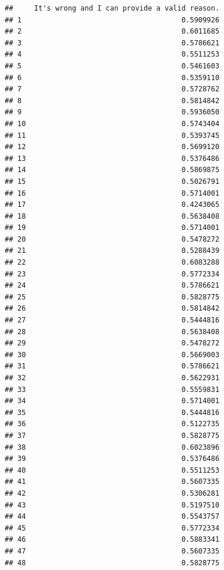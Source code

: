 \documentclass[
  american,
  man,floatsintext]{apa7}
\begin{document}
\begin{verbatim}
##     It's wrong and I can provide a valid reason.
## 1                                      0.5909926
## 2                                      0.6011685
## 3                                      0.5786621
## 4                                      0.5511253
## 5                                      0.5461603
## 6                                      0.5359110
## 7                                      0.5728762
## 8                                      0.5814842
## 9                                      0.5936050
## 10                                     0.5743404
## 11                                     0.5393745
## 12                                     0.5699120
## 13                                     0.5376486
## 14                                     0.5869875
## 15                                     0.5026791
## 16                                     0.5714001
## 17                                     0.4243065
## 18                                     0.5638408
## 19                                     0.5714001
## 20                                     0.5478272
## 21                                     0.5288439
## 22                                     0.6083288
## 23                                     0.5772334
## 24                                     0.5786621
## 25                                     0.5828775
## 26                                     0.5814842
## 27                                     0.5444816
## 28                                     0.5638408
## 29                                     0.5478272
## 30                                     0.5669003
## 31                                     0.5786621
## 32                                     0.5622931
## 33                                     0.5559831
## 34                                     0.5714001
## 35                                     0.5444816
## 36                                     0.5122735
## 37                                     0.5828775
## 38                                     0.6023896
## 39                                     0.5376486
## 40                                     0.5511253
## 41                                     0.5607335
## 42                                     0.5306281
## 43                                     0.5197510
## 44                                     0.5543757
## 45                                     0.5772334
## 46                                     0.5883341
## 47                                     0.5607335
## 48                                     0.5828775

\end{verbatim}
\end{document}
